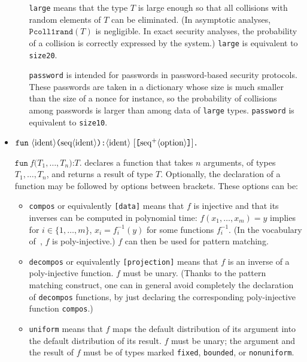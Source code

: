 \begin{itemize}
\begin{itemize}
\begin{enumerate}
\end{enumerate}

\texttt{large} means that the type $T$ is large enough so that
all collisions with random elements of $T$ can be eliminated. 
(In asymptotic analyses, $\texttt{Pcoll1rand}(T)$ is negligible. 
In exact security analyses, the
probability of a collision is correctly expressed by the system.)
\texttt{large} is equivalent to \texttt{size20}.

\texttt{password} is intended for passwords in password-based
security protocols. These passwords are taken in a dictionary whose
size is much smaller than the size of a nonce for instance,
so the probability of collisions among passwords is larger 
than among data of \texttt{large} types.
\texttt{password} is equivalent to \texttt{size10}.

\end{itemize}

\item $\texttt{fun}\ \nonterm{ident}\texttt{(}\seq{ident}\texttt{):}\nonterm{ident}\ [\texttt{[}\neseq{option}\texttt{]}]\texttt{.}$

$\texttt{fun}\ f\texttt{(}T_1, \ldots, T_n\texttt{):}T\texttt{.}$ 
declares a function that takes $n$ arguments, of types $T_1, \ldots, T_n$, 
and returns a result of type $T$.
Optionally, the declaration of a function may be followed by options
between brackets. These options can be:
\begin{itemize}

\item \texttt{compos} or equivalently \texttt{[data]} means that $f$ is injective and that its
inverses can be computed in polynomial time: $f(x_1, \ldots, x_m) = y$
implies for $i \in \{1, \ldots, m\}$, $x_i = f_i^{-1}(y)$ for some 
functions $f_i^{-1}$. (In the vocabulary of~\cite{BlanchetEPrint05},
$f$ is poly-injective.) $f$ can then be used for pattern matching.

\item \texttt{decompos} or equivalently \texttt{[projection]} means that $f$ is an inverse of a poly-injective
function. $f$ must be unary. (Thanks to the pattern matching construct, one can
in general avoid completely the declaration of \texttt{decompos} functions,
by just declaring the corresponding poly-injective function \texttt{compos}.)

\item \texttt{uniform} means that $f$ maps the default distribution
of its argument into the default distribution of its result. $f$ must be unary;
the argument and the result of $f$ must be of types marked 
{\tt fixed}, {\tt bounded}, or {\tt nonuniform}.


\end{itemize}
\end{itemize}
